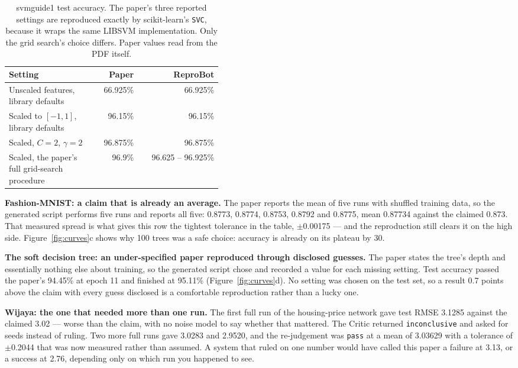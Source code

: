 \documentclass[10pt,twocolumn]{article}
\newcommand{\squeeze}{\setlength{\tabcolsep}{4pt}}
\begin{document}
\begin{table}[tbp]
\centering
\small
\caption{svmguide1 test accuracy. The paper's three reported settings are reproduced exactly by
scikit-learn's \texttt{SVC}, because it wraps the same LIBSVM implementation. Only the grid
search's choice differs. Paper values read from the PDF itself.}
\label{tab:svmexact}
\squeeze
\begin{tabular}{L{0.42\linewidth}rr}
\toprule
Setting & Paper & ReproBot \\
\midrule
Unscaled features, library defaults & 66.925\% & 66.925\% \\
Scaled to $[-1,1]$, library defaults & 96.15\% & 96.15\% \\
Scaled, $C = 2$, $\gamma = 2$ & 96.875\% & 96.875\% \\
Scaled, the paper's full grid-search procedure & 96.9\% & 96.625 -- 96.925\% \\
\bottomrule
\end{tabular}
\end{table}

\textbf{Fashion-MNIST: a claim that is already an average.} The paper reports the mean of five
runs with shuffled training data, so the generated script performs five runs and reports all
five: 0.8773, 0.8774, 0.8753, 0.8792 and 0.8775, mean 0.87734 against the claimed 0.873. That
measured spread is what gives this row the tightest tolerance in the table, $\pm$0.00175 --- and
the reproduction still clears it on the high side. Figure~\ref{fig:curves}c shows why 100 trees
was a safe choice: accuracy is already on its plateau by 30.

\textbf{The soft decision tree: an under-specified paper reproduced through disclosed guesses.}
The paper states the tree's depth and essentially nothing else about training, so the generated
script chose and recorded a value for each missing setting. Test accuracy passed the paper's
94.45\% at epoch 11 and finished at 95.11\% (Figure~\ref{fig:curves}d). No setting was chosen on
the test set, so a result 0.7 points above the claim with every guess disclosed is a comfortable
reproduction rather than a lucky one.

\textbf{Wijaya: the one that needed more than one run.} The first full run of the housing-price
network gave test RMSE 3.1285 against the claimed 3.02 --- worse than the claim, with no noise
model to say whether that mattered. The Critic returned \texttt{inconclusive} and asked for
seeds instead of ruling. Two more full runs gave 3.0283 and 2.9520, and the re-judgement was
\texttt{pass} at a mean of 3.03629 with a tolerance of $\pm$0.2044 that was now measured rather
than assumed. A system that ruled on one number would have called this paper a failure at 3.13,
or a success at 2.76, depending only on which run you happened to see.
\end{document}
